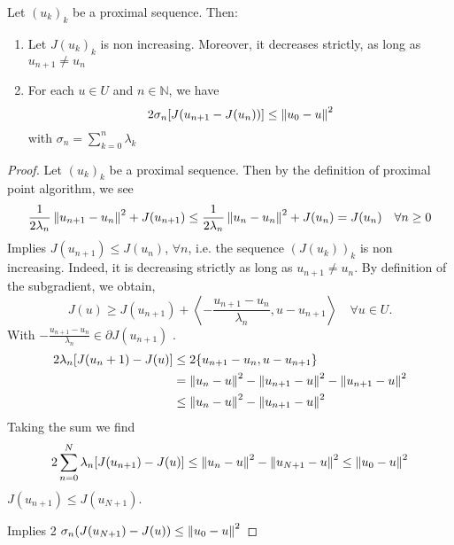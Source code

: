 \begin{lemma}
	\label{lemma11. Proximal sequence.}
	Let $(u_k)_k$ be a proximal sequence. Then:
	\begin{enumerate}
		\item Let $J(u_k)_k$ is non increasing. Moreover, it decreases strictly, as long as $u_{n+1} \neq u_n$
		\item For each $u\in U$ and $n\in \mathbb{N}$, we have 
		\[
			2 \sigma_n [J(u_{n+1}-J(u_n))] \leq \left\lVert u_0 - u \right\rVert^2
		\]
		with $\sigma_n = \sum_{k=0}^{n} \lambda_k$
	\end{enumerate}
	\begin{proof}
		Let $(u_k)_k$ be a proximal sequence. Then by the definition of proximal point algorithm, we see
		\[
			\frac{1}{2\lambda_n}\left\lVert u_{n+1}-u_n\right\rVert^2 + J(u_{n+1}) \leq \frac{1}{2\lambda_n}\left\lVert u_{n}-u_n\right\rVert^2 + J(u_{n}) = J(u_n) \quad \forall n \geq 0
		\]
		Implies $J(u_{n+1}) \leq J(u_n)$, $\forall n$, i.e. the sequence $(J(u_k))_k$ is non increasing. Indeed, it is decreasing strictly as long as $u_{n+1}\neq u_{n}$.
		By definition of the subgradient, we obtain,
		\begin{equation*}
			J(u) \geq J(u_{n+1}) + \left\langle -\frac{u_{n+1}-u_n}{\lambda_n} , u-u_{n+1} \right\rangle  \quad \forall u \in U.
		\end{equation*}
		With $-\frac{u_{n+1}-u_n}{\lambda_n} \in \partial J(u_{n+1})$ .
		\begin{align*}
			2\lambda_n [J(u_n+1)-J(u)] &\leq 2 \lbrace u_{n+1}-u_n, u-u_{n+1}\rbrace \\
			&= \left\lVert u_n-u\right\rVert^2 -\left\lVert u_{n+1}-u\right\rVert^2 -\left\lVert u_{n+1}-u\right\rVert^2 \\
			&\leq \left\lVert u_n-u\right\rVert^2 - \left\lVert u_{n+1}-u\right\rVert^2
		\end{align*}
		Taking the sum we find
		\begin{align}
			2\sum_{n=0}^{N} \lambda_n [J(u_{n+1})-J(u)] \leq \left\lVert u_n-u\right\rVert^2 - \left\lVert u_{N+1}-u\right\rVert^2 \leq \left\lVert u_0 - u\right\rVert^2
		\end{align}
		$J(u_{n+1}) \leq J(u_{N+1}) $.
		
		Implies 2 $\sigma_n (J(u_{N+1})-J(u)) \leq \left\lVert u_0 - u\right\rVert^2$
	\end{proof}
\end{lemma}

